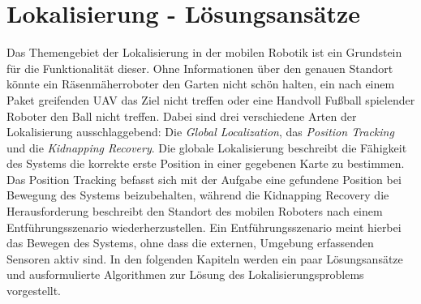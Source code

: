 \clearpage
\chapter{\textbf{Lokalisierung - Lösungsansätze}}\label{chap:Lokalisierung - Lösungsansätze}
Das Themengebiet der Lokalisierung in der mobilen Robotik ist ein Grundstein für die Funktionalität dieser. Ohne Informationen über den genauen Standort könnte ein Räsenmäherroboter den Garten nicht schön halten, ein nach einem Paket greifenden UAV das Ziel nicht treffen oder eine Handvoll Fußball spielender Roboter den Ball nicht treffen. Dabei sind drei verschiedene Arten der Lokalisierung ausschlaggebend: Die \textit{Global Localization}, das \textit{Position Tracking} und die \textit{Kidnapping Recovery}. Die globale Lokalisierung beschreibt die Fähigkeit des Systems die korrekte erste Position in einer gegebenen Karte zu bestimmen. Das Position Tracking befasst sich mit der Aufgabe eine gefundene Position bei Bewegung des Systems beizubehalten, während die Kidnapping Recovery die Herausforderung beschreibt den Standort des mobilen Roboters nach einem Entführungsszenario wiederherzustellen. Ein Entführungsszenario meint hierbei das Bewegen des Systems, ohne dass die externen, Umgebung erfassenden Sensoren aktiv sind. In den folgenden Kapiteln werden ein paar Lösungsansätze und ausformulierte Algorithmen zur Lösung des Lokalisierungsproblems vorgestellt.

